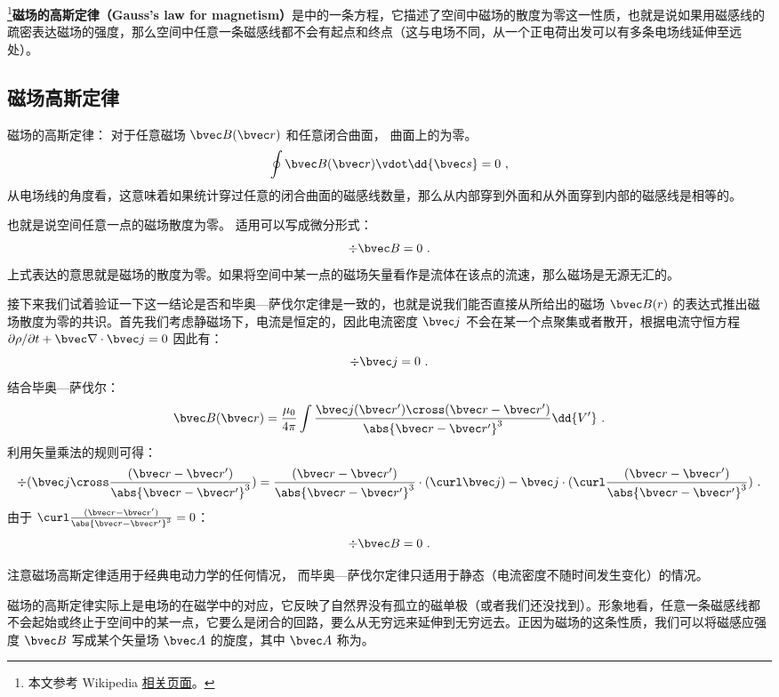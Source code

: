 
\begin{issues}
\issueDraft
\end{issues}


\footnote{本文参考 Wikipedia \href{https://en.wikipedia.org/wiki/Gauss's_law_for_magnetism}{相关页面}。}\textbf{磁场的高斯定律（Gauss's law for magnetism）}是中的一条方程，它描述了空间中磁场的散度为零这一性质，也就是说如果用磁感线的疏密表达磁场的强度，那么空间中任意一条磁感线都不会有起点和终点（这与电场不同，从一个正电荷出发可以有多条电场线延伸至远处）。

\subsection{磁场高斯定律}
磁场的高斯定律： 对于任意磁场 $\bvec B(\bvec r)$ 和任意闭合曲面， 曲面上的为零。
\begin{equation}
\oint \bvec B(\bvec r) \vdot \dd{\bvec s} = 0~,
\end{equation}
从电场线的角度看，这意味着如果统计穿过任意的闭合曲面的磁感线数量，那么从内部穿到外面和从外面穿到内部的磁感线是相等的。

也就是说空间任意一点的磁场散度为零。 适用可以写成微分形式：
\begin{equation}
\div\bvec B = 0~.
\end{equation}
上式表达的意思就是磁场的散度为零。如果将空间中某一点的磁场矢量看作是流体在该点的流速，那么磁场是无源无汇的。

接下来我们试着验证一下这一结论是否和毕奥—萨伐尔定律是一致的，也就是说我们能否直接从所给出的磁场 $\bvec B(r)$ 的表达式推出磁场散度为零的共识。首先我们考虑静磁场下，电流是恒定的，因此电流密度 $\bvec j$ 不会在某一个点聚集或者散开，根据电流守恒方程 $\partial \rho/\partial t + \bvec \nabla\cdot \bvec j=0$ 因此有：
\begin{equation}
\div \bvec j = 0  ~.
\end{equation}
结合毕奥—萨伐尔：
\begin{equation}
\bvec B(\bvec r) = \frac{\mu_0}{4\pi} \int \frac{\bvec j(\bvec r') \cross (\bvec r - \bvec r')}{\abs{\bvec r - \bvec r'}^3} \dd{V'}~.
\end{equation}
利用矢量乘法的规则可得：
\begin{equation}
\div(\bvec j \cross \frac{(\bvec r - \bvec r')}{\abs{\bvec r - \bvec r'}^3})=\frac{(\bvec r - \bvec r')}{\abs{\bvec r - \bvec r'}^3}\cdot(\curl \bvec j)-\bvec j\cdot(\curl \frac{(\bvec r - \bvec r')}{\abs{\bvec r - \bvec r'}^3})~.
\end{equation}
由于 $\curl \frac{(\bvec r - \bvec r')}{\abs{\bvec r - \bvec r'}^3} = 0$：
\begin{equation}
\div \bvec B = 0  ~.
\end{equation}

注意磁场高斯定律适用于经典电动力学的任何情况， 而毕奥—萨伐尔定律只适用于静态（电流密度不随时间发生变化）的情况。

磁场的高斯定律实际上是电场的在磁学中的对应，它反映了自然界没有孤立的磁单极（或者我们还没找到）。形象地看，任意一条磁感线都不会起始或终止于空间中的某一点，它要么是闭合的回路，要么从无穷远来延伸到无穷远去。正因为磁场的这条性质，我们可以将磁感应强度 $\bvec B$ 写成某个矢量场 $\bvec A$ 的旋度，其中 $\bvec A$ 称为。
